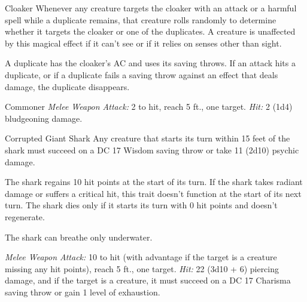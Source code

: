 \documentclass[10pt,a4paper,twoside,bg=print,twocolumn,openany,nodeprecatedcode]{dndbook}
\begin{document}
\begin{DndMonster}[float=t]{Cloaker}
Whenever any creature targets the cloaker with an attack or a harmful spell while a duplicate remains, that creature rolls randomly to determine whether it targets the cloaker or one of the duplicates. A creature is unaffected by this magical effect if it can't see or if it relies on senses other than sight.

A duplicate has the cloaker's AC and uses its saving throws. If an attack hits a duplicate, or if a duplicate fails a saving throw against an effect that deals damage, the duplicate disappears.

\end{DndMonster}



\begin{DndMonster}[float=t]{Commoner}
\DndMonsterBasics[
armor-class = {10},
hit-points = {\DndDice{1d8}},
speed = {30 ft.}
]
\DndMonsterAbilityScores[
 str = 10,
 dex = 10,
 con = 10,
 int = 10,
 wis = 10,
 cha = 10
]
\DndMonsterDetails[
languages = {any one language (usually Common)},
challenge = 0,
]
\textsl{Melee Weapon Attack:} 2 to hit, reach 5 ft., one target. \textsl{Hit:} 2 (1d4) bludgeoning damage.

\end{DndMonster}



\begin{DndMonster}[float=t]{Corrupted Giant Shark}
\DndMonsterBasics[
armor-class = {13 (natural armor)},
hit-points = {\DndDice{11d12 + 55}},
speed = {0 ft., swim 50 ft.}
]
\DndMonsterAbilityScores[
 str = 23,
 dex = 11,
 con = 21,
 int = 1,
 wis = 10,
 cha = 5
]
\DndMonsterDetails[
skills = {Perception +4},
senses = {blindsight 60 ft., passive perception 14},
challenge = 9,
]
Any creature that starts its turn within 15 feet of the shark must succeed on a DC 17 Wisdom saving throw or take 11 (2d10) psychic damage.

The shark regains 10 hit points at the start of its turn. If the shark takes radiant damage or suffers a critical hit, this trait doesn't function at the start of its next turn. The shark dies only if it starts its turn with 0 hit points and doesn't regenerate.

The shark can breathe only underwater.

\textsl{Melee Weapon Attack:} 10 to hit (with advantage if the target is a creature missing any hit points), reach 5 ft., one target. \textsl{Hit:} 22 (3d10 + 6) piercing damage, and if the target is a creature, it must succeed on a DC 17 Charisma saving throw or gain 1 level of exhaustion.

\end{DndMonster}
\end{document}

